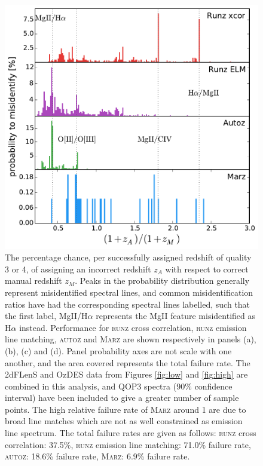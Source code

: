 \documentclass[iop]{emulateapj}
\newcommand{\runz}{\textsc{runz}}
\newcommand{\autoz}{\textsc{autoz}}
\newcommand{\marz}{\textsc{Marz}}
\begin{document}
\begin{figure}[h]
\centering
\includegraphics[width=\columnwidth]{errorRateqop3.pdf}
\caption{The percentage chance, per successfully assigned redshift of quality 3 or 4, of assigning an incorrect redshift $z_A$ with respect to correct manual redshift $z_M$. Peaks in the probability distribution generally represent misidentified spectral lines, and common misidentification ratios have had the corresponding spectral lines labelled, such that the first label, MgII/H$\alpha$ represents the MgII feature misidentified as H$\alpha$ instead. Performance for \runz{} cross correlation, \runz{} emission line matching, \autoz{} and \marz{} are shown respectively in panels (a), (b), (c) and (d). Panel probability axes are not scale with one another, and the area covered represents the total failure rate. The 2dFLenS and OzDES data from Figures \ref{fig:low} and \ref{fig:high} are combined in this analysis, and QOP3 spectra (90\% confidence interval) have been included to give a greater number of sample points. The high relative failure rate of \marz{} around 1 are due to broad line matches which are not as well constrained as emission line spectrum. The total failure rates are given as follows: \runz{} cross correlation: 37.5\%, \runz{} emission line matching: 71.0\% failure rate, \autoz{}: 18.6\% failure rate, \marz{}: 6.9\% failure rate.}
\label{fig:f4}
\end{figure}
\end{document}

